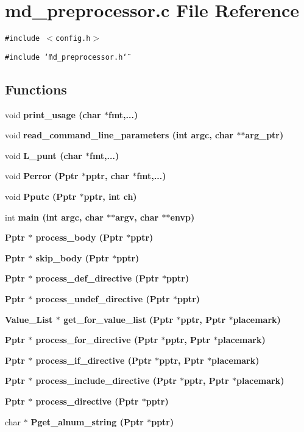 \section{md\_\-preprocessor.c File Reference}
\label{md__preprocessor_8c}
{\tt \#include $<$config.h$>$}\par
{\tt \#include \char`\"{}md\_\-preprocessor.h\char`\"{}}\par
\subsection*{Functions}
\begin{CompactItemize}
\item 
void \bf{print\_\-usage} (char $\ast$fmt,...)
\item 
void \bf{read\_\-command\_\-line\_\-parameters} (int argc, char $\ast$$\ast$arg\_\-ptr)
\item 
void \bf{L\_\-punt} (char $\ast$fmt,...)
\item 
void \bf{Perror} (\bf{Pptr} $\ast$pptr, char $\ast$fmt,...)
\item 
void \bf{Pputc} (\bf{Pptr} $\ast$pptr, int ch)
\item 
int \bf{main} (int argc, char $\ast$$\ast$argv, char $\ast$$\ast$envp)
\item 
\bf{Pptr} $\ast$ \bf{process\_\-body} (\bf{Pptr} $\ast$pptr)
\item 
\bf{Pptr} $\ast$ \bf{skip\_\-body} (\bf{Pptr} $\ast$pptr)
\item 
\bf{Pptr} $\ast$ \bf{process\_\-def\_\-directive} (\bf{Pptr} $\ast$pptr)
\item 
\bf{Pptr} $\ast$ \bf{process\_\-undef\_\-directive} (\bf{Pptr} $\ast$pptr)
\item 
\bf{Value\_\-List} $\ast$ \bf{get\_\-for\_\-value\_\-list} (\bf{Pptr} $\ast$pptr, \bf{Pptr} $\ast$placemark)
\item 
\bf{Pptr} $\ast$ \bf{process\_\-for\_\-directive} (\bf{Pptr} $\ast$pptr, \bf{Pptr} $\ast$placemark)
\item 
\bf{Pptr} $\ast$ \bf{process\_\-if\_\-directive} (\bf{Pptr} $\ast$pptr, \bf{Pptr} $\ast$placemark)
\item 
\bf{Pptr} $\ast$ \bf{process\_\-include\_\-directive} (\bf{Pptr} $\ast$pptr, \bf{Pptr} $\ast$placemark)
\item 
\bf{Pptr} $\ast$ \bf{process\_\-directive} (\bf{Pptr} $\ast$pptr)
\item 
char $\ast$ \bf{Pget\_\-alnum\_\-string} (\bf{Pptr} $\ast$pptr)
$$
\end{CompactItemize}

